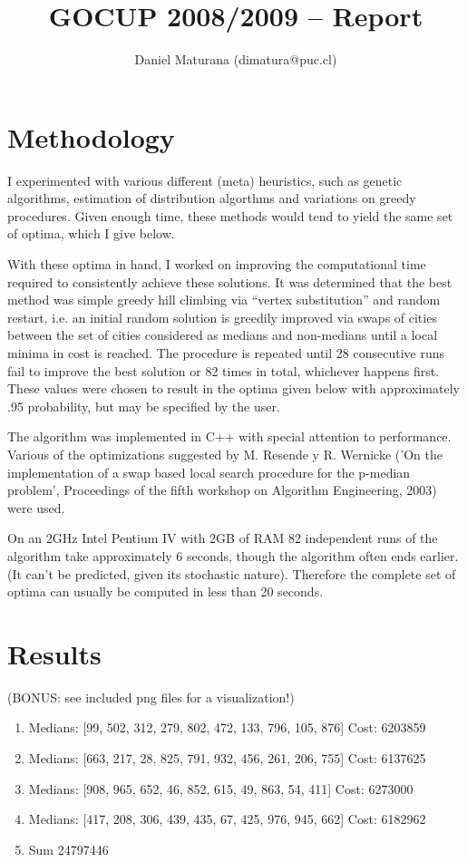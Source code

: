 \documentclass[11pt,letterpaper]{article}
\title{GOCUP 2008/2009 -- Report}
\author{Daniel Maturana (dimatura@puc.cl)}
\begin{document}
\maketitle
\section{Methodology}
I experimented with various different (meta) heuristics, such as genetic
algorithms, estimation of distribution algorthms and variations on greedy
procedures. Given enough time, these methods would tend to yield
the same set of optima, which I give below. 

With these optima in hand, I worked on improving the computational time
required to consistently achieve these solutions. It was determined that the
best method was simple greedy hill climbing via ``vertex substitution'' and
random restart, i.e. an initial random solution is greedily improved via swaps
of cities between the set of cities considered as medians and non-medians until
a local minima in cost is reached. The procedure is repeated until 28
consecutive runs fail to improve the best solution or 82 times in total,
whichever happens first. These values were chosen to result in the optima given
below with approximately .95 probability, but may be specified by the user. 

The algorithm was implemented in C++ with special attention to performance.
Various of the optimizations suggested by  M. Resende y R. Wernicke ('On the
implementation of a swap based local search procedure for the p-median
problem', Proceedings of the fifth workshop on Algorithm Engineering, 2003)
were used.

On an 2GHz Intel Pentium IV with 2GB of RAM 82 independent runs of the
algorithm take approximately 6 seconds, though the algorithm often ends
earlier. (It can't be predicted, given its stochastic nature). Therefore 
the complete set of optima can usually be computed in less than 20
seconds.

\section{Results}
(BONUS: see included png files for a visualization!)

\begin{enumerate}

\item Medians: [99, 502, 312, 279, 802, 472, 133, 796, 105, 876]
Cost: 6203859

\item Medians: [663, 217, 28, 825, 791, 932, 456, 261, 206, 755]
Cost: 6137625

\item Medians: [908, 965, 652, 46, 852, 615, 49, 863, 54, 411]
Cost: 6273000

\item Medians: [417, 208, 306, 439, 435, 67, 425, 976, 945, 662]
Cost: 6182962

\item Sum
24797446
\end{enumerate}
\end{document}
